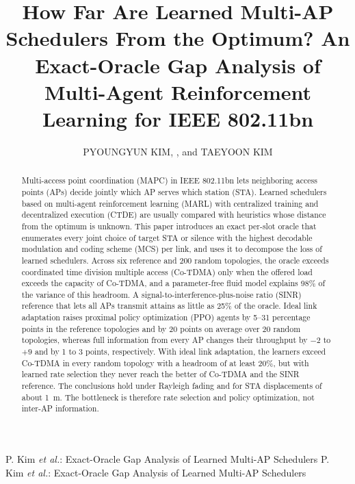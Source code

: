 \documentclass{ieeeaccess}
\begin{document}

\title{How Far Are Learned Multi-AP Schedulers From the Optimum? An Exact-Oracle Gap Analysis of Multi-Agent Reinforcement Learning for IEEE 802.11bn}
\author{\uppercase{Pyoungyun Kim}, , and \uppercase{Taeyoon Kim}}
\address[1]{Korea University, 145 Anam-ro, Seongbuk-gu, Seoul 02841, Republic of Korea}
\address[2]{Visual Display Division, Samsung Electronics, Republic of Korea}
\address[3]{School of Mobile System Engineering, Dankook University, Yongin 16890, Republic of Korea}

\markboth
{P. Kim \emph{et al.}: Exact-Oracle Gap Analysis of Learned Multi-AP Schedulers}
{P. Kim \emph{et al.}: Exact-Oracle Gap Analysis of Learned Multi-AP Schedulers}


\begin{abstract}
Multi-access point coordination (MAPC) in IEEE 802.11bn lets neighboring access points (APs) decide jointly which AP serves which station (STA). Learned schedulers based on multi-agent reinforcement learning (MARL) with centralized training and decentralized execution (CTDE) are usually compared with heuristics whose distance from the optimum is unknown. This paper introduces an exact per-slot oracle that enumerates every joint choice of target STA or silence with the highest decodable modulation and coding scheme (MCS) per link, and uses it to decompose the loss of learned schedulers. Across six reference and 200 random topologies, the oracle exceeds coordinated time division multiple access (Co-TDMA) only when the offered load exceeds the capacity of Co-TDMA, and a parameter-free fluid model explains 98\% of the variance of this headroom. A signal-to-interference-plus-noise ratio (SINR) reference that lets all APs transmit attains as little as 25\% of the oracle. Ideal link adaptation raises proximal policy optimization (PPO) agents by 5--31 percentage points in the reference topologies and by 20 points on average over 20 random topologies, whereas full information from every AP changes their throughput by $-2$ to $+9$ and by 1 to 3 points, respectively. With ideal link adaptation, the learners exceed Co-TDMA in every random topology with a headroom of at least 20\%, but with learned rate selection they never reach the better of Co-TDMA and the SINR reference. The conclusions hold under Rayleigh fading and for STA displacements of about 1~m. The bottleneck is therefore rate selection and policy optimization, not inter-AP information.
\end{abstract}
\end{document}
